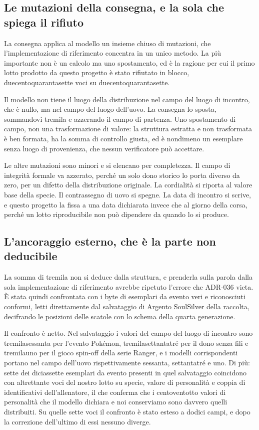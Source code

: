 \subsection{Le mutazioni della consegna, e la sola che spiega il rifiuto}

La consegna applica al modello un insieme chiuso di mutazioni, che l'implementazione di riferimento concentra in un unico metodo. La più importante non è un calcolo ma uno spostamento, ed è la ragione per cui il primo lotto prodotto da questo progetto è stato rifiutato in blocco, duecentoquarantasette voci su duecentoquarantasette.

Il modello non tiene il luogo della distribuzione nel campo del luogo di incontro, che è nullo, ma nel campo del luogo dell'uovo. La consegna lo sposta, sommandovi tremila e azzerando il campo di partenza. Uno spostamento di campo, non una trasformazione di valore: la struttura estratta e non trasformata è ben formata, ha la somma di controllo giusta, ed è nondimeno un esemplare senza luogo di provenienza, che nessun verificatore può accettare.

Le altre mutazioni sono minori e si elencano per completezza. Il campo di integrità formale va azzerato, perché un solo dono storico lo porta diverso da zero, per un difetto della distribuzione originale. La cordialità si riporta al valore base della specie. Il contrassegno di uovo si spegne. La data di incontro si scrive, e questo progetto la fissa a una data dichiarata invece che al giorno della corsa, perché un lotto riproducibile non può dipendere da quando lo si produce.

\subsection{L'ancoraggio esterno, che è la parte non deducibile}

La somma di tremila non si deduce dalla struttura, e prenderla sulla parola dalla sola implementazione di riferimento avrebbe ripetuto l'errore che ADR-036 vieta. È stata quindi confrontata con i byte di esemplari da evento veri e riconosciuti conformi, letti direttamente dal salvataggio di Argento SoulSilver della raccolta, decifrando le posizioni delle scatole con lo schema della quarta generazione.

Il confronto è netto. Nel salvataggio i valori del campo del luogo di incontro sono tremilasessanta per l'evento Pokémon, tremilasettantatré per il dono senza fili e tremilauno per il gioco spin-off della serie Ranger, e i modelli corrispondenti portano nel campo dell'uovo rispettivamente sessanta, settantatré e uno. Di più: sette dei diciassette esemplari da evento presenti in quel salvataggio coincidono con altrettante voci del nostro lotto su specie, valore di personalità e coppia di identificativi dell'allenatore, il che conferma che i centoventotto valori di personalità che il modello dichiara e noi conserviamo sono davvero quelli distribuiti. Su quelle sette voci il confronto è stato esteso a dodici campi, e dopo la correzione dell'ultimo di essi nessuno diverge.

